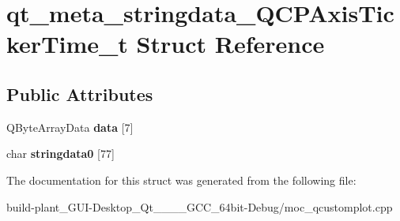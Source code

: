 \hypertarget{structqt__meta__stringdata__QCPAxisTickerTime__t}{}\section{qt\+\_\+meta\+\_\+stringdata\+\_\+\+Q\+C\+P\+Axis\+Ticker\+Time\+\_\+t Struct Reference}
\label{structqt__meta__stringdata__QCPAxisTickerTime__t}
\subsection*{Public Attributes}
\begin{DoxyCompactItemize}
\item 
\mbox{\label{structqt__meta__stringdata__QCPAxisTickerTime__t_a0e812edae0b72b531ae152e0bed2a3f5}} 
Q\+Byte\+Array\+Data {\bfseries data} \mbox{[}7\mbox{]}
\item 
\mbox{\label{structqt__meta__stringdata__QCPAxisTickerTime__t_aad085a5c9bf7f31e1826758e85aebe4e}} 
char {\bfseries stringdata0} \mbox{[}77\mbox{]}
\end{DoxyCompactItemize}


The documentation for this struct was generated from the following file\+:\begin{DoxyCompactItemize}
\item 
build-\/plant\+\_\+\+G\+U\+I-\/\+Desktop\+\_\+\+Qt\+\_\+\_\+\_\+\_\+\+G\+C\+C\+\_\+64bit-\/\+Debug/moc\+\_\+qcustomplot.\+cpp\end{DoxyCompactItemize}
